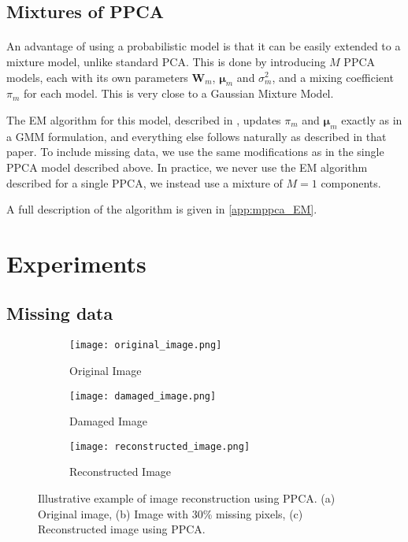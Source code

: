 \documentclass{article}
\begin{document}
\subsection{Mixtures of PPCA}
\label{sec:mppca}

\paragraph{} An advantage of using a probabilistic model is that it can be easily extended to a mixture model, unlike standard PCA. This is done by introducing $M$ PPCA models, each with its own parameters $\mathbf{W}_m$, $\boldsymbol{\mu}_m$ and $\sigma^2_m$, and a mixing coefficient $\pi_m$ for each model. This is very close to a Gaussian Mixture Model.

The EM algorithm for this model, described in \citet{MPPCA}, updates $\pi_m$ and $\boldsymbol{\mu}_m$ exactly as in a GMM formulation, and everything else follows naturally as described in that paper. To include missing data, we use the same modifications as in the single PPCA model described above. In practice, we never use the EM algorithm described for a single PPCA, we instead use a mixture of $M = 1$ components.

A full description of the algorithm is given in \ref{app:mppca_EM}.

\section{Experiments}

\subsection{Missing data}

\begin{figure}[H]
    \centering
    \begin{subfigure}[b]{0.3\textwidth}
        \centering
        \texttt{[image: original\_image.png]}
        \caption{Original Image}
        \label{fig:original_image}
    \end{subfigure}
    \hfill
    \begin{subfigure}[b]{0.3\textwidth}
        \centering
        \texttt{[image: damaged\_image.png]}
        \caption{Damaged Image}
        \label{fig:damaged_image}
    \end{subfigure}
    \hfill
    \begin{subfigure}[b]{0.3\textwidth}
        \centering
        \texttt{[image: reconstructed\_image.png]}
        \caption{Reconstructed Image}
        \label{fig:reconstructed_image}
    \end{subfigure}
    \caption{Illustrative example of image reconstruction using PPCA. (a) Original image, (b) Image with 30\% missing pixels, (c) Reconstructed image using PPCA.}
    \label{fig:mnist_reconstruction}
\end{figure}
\end{document}

